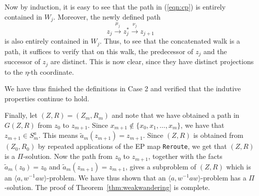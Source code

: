 \documentclass[11pt]{amsart}
\theoremstyle{definition}
\theoremstyle{definition}
\numberwithin{equation}{section}
\begin{document}
Now by induction, it is easy to see that the path in (\ref{eqn:cp}) is entirely contained in $W_j$. Moreover, the newly defined path 
$$ z_j\stackrel{\mu_j}{\longrightarrow} z_j^*\stackrel{\nu_j}{\longrightarrow} z_{j+1} $$
is also entirely contained in $W_j$. Thus, to see that the concatenated walk is a path, it suffices to verify that on this walk, the predecessor of $z_j$ and the successor of $z_j$ are distinct. This is now clear, since they have distinct projections to the $\eta$-th coordinate. 

We have thus finished the definitions in Case 2 and verified that the indutive properties continue to hold. 

Finally, let $(Z, R)=(Z_m, R_m)$ and note that we have obtained a path in $G(Z, R)$ from $z_0$ to $z_{m+1}$. Since 
$x_{m+1}\not\in \{x_0, x_1, \dots, x_m\}$, we have that $z_{m+1}\in S_m^a$. This means $\tilde{a}_m(z_{m+1})=z_{m+1}$. Since $(Z, R)$ is obtained from $(Z_0, R_0)$ by repeated applications of the EP map {\tt Reroute}, we get that $(Z, R)$ is a $\Pi$-solution. Now the path from $z_0$ to $z_{m+1}$, together with the facts $\tilde{a}_m(z_0)=z_0$ and $\tilde{a}_m(z_{m+1})=z_{m+1}$, gives a subproblem of $(Z, R)$ which is an $\langle a, w^{-1}aw\rangle$-problem. We have thus shown that an $\langle a, w^{-1}aw\rangle$-problem has a $\Pi$-solution. The proof of Theorem~\ref{thm:weakwandering} is complete.
\end{document}
